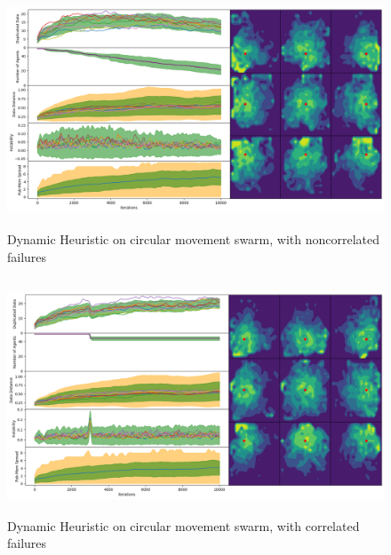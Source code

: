 \documentclass{UoYCSproject}
\begin{document}
\begin{figure}[htb]
\label{fig:circle_movement_non2}
\begin{center}
\centering
\includegraphics[height=7cm]{"./Dynamic_Heuristic/Cicrle_Move_non.png"}
\caption{Dynamic Heuristic on circular movement swarm, with non\-correlated failures}
\end{center}
\end{figure}

\begin{figure}[htb]
\label{fig:circle_movement_con2}
\begin{center}
\centering
\includegraphics[height=7cm]{"./Dynamic_Heuristic/Circle_Move_con.png"}
\caption{Dynamic Heuristic on circular movement swarm, with correlated failures}
\end{center}
\end{figure}

\end{document}
